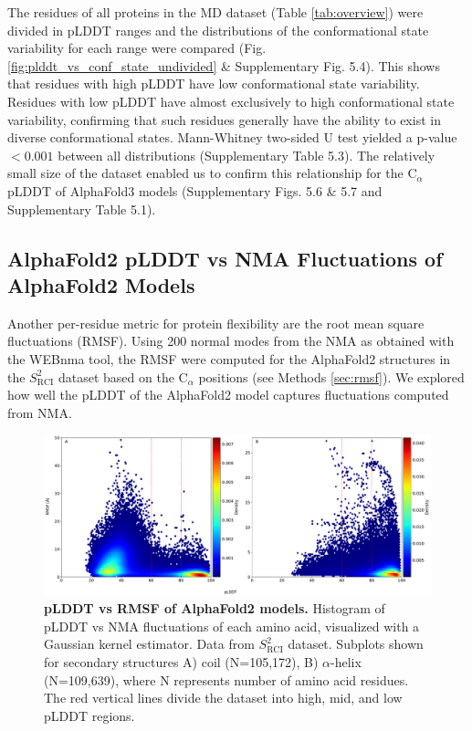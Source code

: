 The residues of all proteins in the MD dataset (Table \ref{tab:overview}) were divided in pLDDT ranges and the distributions of the conformational state variability for each range were compared (Fig. \ref{fig:plddt_vs_conf_state_undivided} \& Supplementary Fig. 5.4).
This shows that residues with high pLDDT have low conformational state variability. Residues with low pLDDT have almost exclusively to high conformational state variability, confirming that such residues generally have the ability to exist in diverse conformational states. Mann-Whitney two-sided U test yielded a p-value \( < 0.001 \) between all distributions (Supplementary Table 5.3). 
The relatively small size of the dataset enabled us to confirm this relationship for the C$_\alpha$ pLDDT of AlphaFold3 models (Supplementary Figs. 5.6 \& 5.7 and Supplementary Table 5.1).

\subsection{AlphaFold2 pLDDT vs NMA Fluctuations of AlphaFold2 Models}

Another per-residue metric for protein flexibility are the root mean square fluctuations (RMSF). Using 200 normal modes from the NMA as obtained with the WEBnma tool, the RMSF were computed for the AlphaFold2 structures in the $S^2_{\text{RCI}}$ dataset based on the C$_\alpha$ positions (see Methods \ref{sec:rmsf}). 
We explored how well the pLDDT of the AlphaFold2 model captures fluctuations computed from NMA.

\begin{figure}[htb!]
    \centering
    \includegraphics[width=\textwidth]{pLDDT/plddt_figures/figures_bhawna/main_scatterplot_tr_RMSF_plddt_C_H_hexbin.pdf}
    \caption{\textbf{pLDDT vs RMSF of AlphaFold2 models.} Histogram of pLDDT vs NMA fluctuations of each amino acid, visualized with a Gaussian kernel estimator. Data from $S^{2}_{\text{RCI}}$ dataset. Subplots shown for secondary structures A) coil (N=105,172), B) $\alpha$-helix (N=109,639), where N represents number of amino acid residues. The red vertical lines divide the dataset into high, mid, and low pLDDT regions. 
    }
    \label{fig:plddt_vs_RMSF}
\end{figure}

